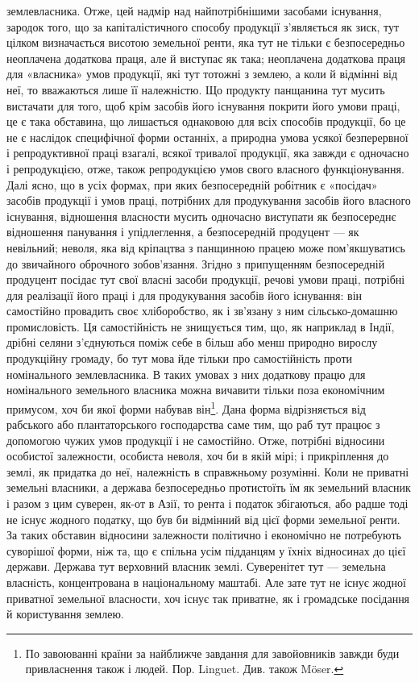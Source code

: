 землевласника. Отже, цей надмір над найпотрібнішими засобами існування, зародок
того, що за капіталістичного способу продукції з’являється як зиск,
тут цілком визначається висотою земельної ренти, яка тут не тільки
є безпосередньо неоплачена додаткова праця, але й виступає як така; неоплачена
додаткова праця для «власника» умов продукції, які тут тотожні з землею, а коли
й відмінні від неї, то вважаються лише її належністю. Що продукту панщанина тут
мусить вистачати для того, щоб крім засобів його існування покрити його умови
праці, це є така обставина, що лишається однаковою для всіх способів продукції,
бо це не є наслідок специфічної форми останніх, а природна умова усякої безперервної
і репродуктивної праці взагалі, всякої тривалої продукції, яка завжди
є одночасно і репродукцією, отже, також репродукцією умов свого власного функціонування.
Далі ясно, що в усіх формах, при яких безпосередній робітник є
«посідач» засобів продукції і умов праці, потрібних для продукування засобів
його власного існування, відношення власности мусить одночасно виступати
як безпосереднє відношення панування і упідлеглення, а безпосередній
продуцент — як невільний; неволя, яка від кріпацтва з панщинною працею
може пом’якшуватись до звичайного оброчного зобов’язання. Згідно з припущенням
безпосередній продуцент посідає тут свої власні засоби продукції,
речові умови праці, потрібні для реалізації його праці і для продукування
засобів його існування: він самостійно провадить своє хліборобство, як і
зв’язану з ним сільсько-домашню промисловість. Ця самостійність не знищується
тим, що, як наприклад в Індії, дрібні селяни з’єднуються поміж себе в
більш або менш природно вирослу продукційну громаду, бо тут мова йде тільки
про самостійність проти номінального землевласника. В таких умовах з них
додаткову працю для номінального земельного власника можна вичавити
тільки поза економічним примусом, хоч би якої форми набував він\footnote{
По завоюванні країни за найближче завдання для завойовників завжди буди привласнення також і
людей. Пор. Linguet. Див. також Möser.
}. Дана форма
відрізняється від рабського або плантаторського господарства саме тим, що раб
тут працює з допомогою чужих умов продукції і не самостійно. Отже, потрібні
відносини особистої залежности, особиста неволя, хоч би в якій мірі; і прикріплення
до землі, як придатка до неї, належність в справжньому розумінні.
Коли не приватні земельні власники, а держава безпосередньо протистоїть їм
як земельний власник і разом з цим суверен, як-от в Азії, то рента і податок
збігаються, або радше тоді не існує жодного податку, що був би відмінний від цієї
форми земельної ренти. За таких обставин відносини залежности політично і
економічно не потребують суворішої форми, ніж та, що є спільна усім підданцям
у їхніх відносинах до цієї держави. Держава тут верховний власник землі.
Суверенітет тут — земельна власність, концентрована в національному маштабі.
Але зате тут не існує жодної приватної земельної власности, хоч існує так
приватне, як і громадське посідання й користування землею.

